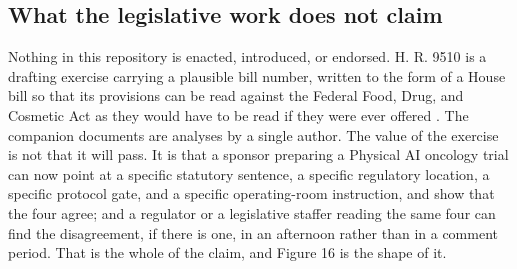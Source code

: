 \subsection{What the legislative work does not claim}

Nothing in this repository is enacted, introduced, or endorsed. H. R. 9510 is a
drafting exercise carrying a plausible bill number, written to the form of a
House bill so that its provisions can be read against the Federal Food, Drug,
and Cosmetic Act as they would have to be read if they were ever offered
\cite{hr9510billv5}. The companion documents are analyses by a single author.
The value of the exercise is not that it will pass. It is that a sponsor
preparing a Physical AI oncology trial can now point at a specific statutory
sentence, a specific regulatory location, a specific protocol gate, and a
specific operating-room instruction, and show that the four agree; and a
regulator or a legislative staffer reading the same four can find the
disagreement, if there is one, in an afternoon rather than in a comment period.
That is the whole of the claim, and Figure 16 is the shape of it.
